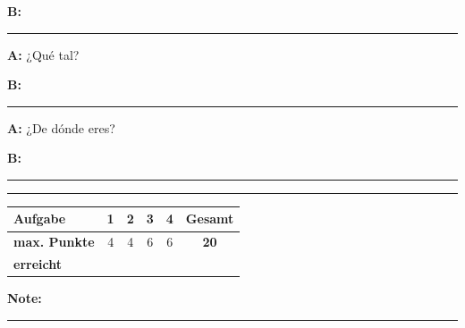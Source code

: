 \documentclass[11pt, a4paper]{article}
\newcommand{\luecke}[1]{\rule{#1}{0.4pt}}
\begin{document}
\noindent
\textbf{B:} \luecke{8cm}

\vspace{0.8em}

\noindent
\textbf{A:} ¿Qué tal?

\vspace{0.8em}

\noindent
\textbf{B:} \luecke{8cm}

\vspace{0.8em}

\noindent
\textbf{A:} ¿De dónde eres?

\vspace{0.8em}

\noindent
\textbf{B:} \luecke{8cm}


\vspace{25pt}
\hrule
\vspace{10pt}

\noindent
\begin{tabularx}{\textwidth}{|X|c|c|c|c||c|}
\hline
\textbf{Aufgabe} & 1 & 2 & 3 & 4 & \textbf{Gesamt} \\
\hline
\textbf{max. Punkte} & 4 & 4 & 6 & 6 & \textbf{20} \\
\hline
\textbf{erreicht} & & & & & \\[0.8em]
\hline
\end{tabularx}

\vspace{10pt}

\begin{flushright}
\textbf{Note:} \luecke{2cm}
\end{flushright}
\end{document}
